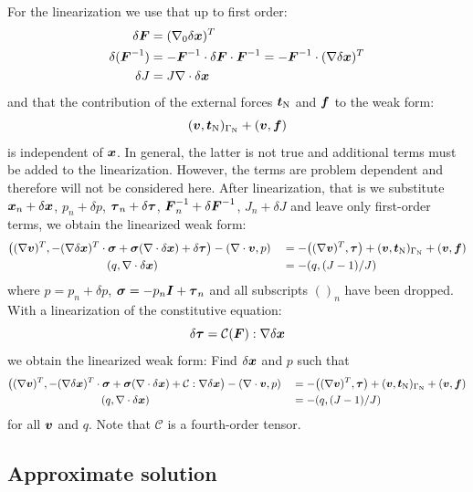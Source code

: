 For the linearization we use that up to first order:
\begin{align*}
   \delta\boldsymbol{F}&=(\nabla_0\delta\boldsymbol{x})^T\\
   \delta(\boldsymbol{F}^{-1})&=-\boldsymbol{F}^{-1}\cdot\delta\boldsymbol{F}\cdot\boldsymbol{F}^{-1}=
    -\boldsymbol{F}^{-1}\cdot(\nabla\delta\boldsymbol{x})^T\\
    \delta J&=J\nabla\cdot\delta\boldsymbol{x}
\end{align*}
and that the contribution of the external forces $\boldsymbol{t}_{\text{N}}$ and $\boldsymbol{f}$ to the
weak form:
\[
          (\boldsymbol{v},\boldsymbol{t}_{\text{N}})_{\Gamma_{\text{N}}}+(\boldsymbol{v},\boldsymbol{f})
\]
is independent of $\boldsymbol{x}$. In general, the latter is not true and additional
terms must be added to the linearization. However, the terms are problem
dependent and therefore will not be considered here. After linearization, that
is we substitute $\boldsymbol{x}_n+\delta\boldsymbol{x}$, $p_n+\delta p$,
$\boldsymbol{\tau}_n+\delta\boldsymbol{\tau}$,
 $\boldsymbol{F}^{-1}_n+\delta\boldsymbol{F}^{-1}$, $J_n+\delta J$ and leave only first-order
terms, we obtain the linearized weak form:
\begin{alignat*}{2}
 &\big((\nabla\vek v)^T,-(\nabla\delta \vek x)^T\cdot\ten\sigma
        +\ten\sigma(\nabla\cdot\delta\vek x)+\delta\ten\tau\big)
    -(\nabla\cdot\vek v,p)
          &&=-\big((\nabla\vek v)^T,\ten\tau\big)
           +(\vek v,\vek t_{\text{N}})_{\Gamma_{\text{N}}}+(\vek v,\vek f)\\
  &\hspace*{3cm}(q,\nabla\cdot\delta\vek x)&& =-(q,(J-1)/J) 
\end{alignat*}
where $p=p_n+\delta p$, $\boldsymbol{\sigma}=-p_n\boldsymbol{I}+\boldsymbol{\tau}_n$ and all subscripts
$()_n$ have been dropped. With a linearization of the constitutive equation:
\[
   \delta\boldsymbol{\tau}=\mathcal{C}(\boldsymbol{F}):\nabla\delta\boldsymbol{x}
\]
we obtain the linearized weak form: Find $\delta\boldsymbol{x}$ and $p$ such that
\begin{alignat*}{2}
 &\big((\nabla\vek v)^T,-(\nabla\delta \vek x)^T\cdot\ten\sigma
        +\ten\sigma(\nabla\cdot\delta\vek x)+\mathcal{C}:\nabla\delta\vek x\big)
    -(\nabla\cdot\vek v,p)
          &&=-\big((\nabla\vek v)^T,\ten\tau\big)
           +(\vek v,\vek t_{\text{N}})_{\Gamma_{\text{N}}}+(\vek v,\vek f)\\
  &\hspace*{3cm}(q,\nabla\cdot\delta\vek x)&& =-(q,(J-1)/J) 
\end{alignat*}
for all $\boldsymbol{v}$ and $q$.
Note that $\mathcal{C}$ is a fourth-order tensor.

\subsection{Approximate solution}

